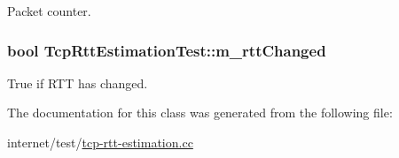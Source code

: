 Packet counter. 

\subsubsection[{\texorpdfstring{m\+\_\+rtt\+Changed}{m_rttChanged}}]{\setlength{\rightskip}{0pt plus 5cm}bool Tcp\+Rtt\+Estimation\+Test\+::m\+\_\+rtt\+Changed\hspace{0.3cm}{\ttfamily [private]}}\hypertarget{classTcpRttEstimationTest_a5282ebae2ff937ed719a965467637fcd}{}\label{classTcpRttEstimationTest_a5282ebae2ff937ed719a965467637fcd}


True if R\+TT has changed. 



The documentation for this class was generated from the following file\+:\begin{DoxyCompactItemize}
\item 
internet/test/\hyperlink{tcp-rtt-estimation_8cc}{tcp-\/rtt-\/estimation.\+cc}\end{DoxyCompactItemize}
